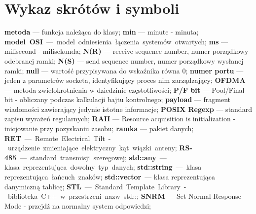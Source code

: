 \newpage
\chapter*{Wykaz skrótów i symboli}
\noindent
\textbf{metoda} --- funkcja należąca do klasy;\newline
\textbf{min} --- minute - minuta;\newline
\textbf{model OSI} --- model odniesienia łączenia systemów otwartych;\newline
\textbf{ms} --- milisecond - milisekunda;\newline
\textbf{N(R)} --- receive sequence number, numer porządkowy odebranej ramki;\newline
\textbf{N(S)} --- send sequence number, numer porządkowy wysłanej ramki;\newline
\textbf{null} --- wartość przypisywana do wskaźnika równa 0;\newline
\textbf{numer portu} --- jeden z parametrów socketa, identyfikujący proces nim zarządzający;\newline
\textbf{OFDMA} --- metoda zwielokrotnienia w dziedzinie częstotliwości;\newline
\textbf{P/F bit} --- Pool/Final bit - obliczany podczas kalkulacji bajtu kontrolnego;\newline
\textbf{payload} --- fragment wiadomości zawierający jedynie istotne informacje;\newline
\textbf{POSIX Regexp} --- standard zapisu wyrażeń regularnych;\newline
\textbf{RAII} --- Resource acquisition is initialization - inicjowanie przy pozyskaniu zasobu;\newline
\textbf{ramka} --- pakiet danych;\newline
\textbf{RET} --- Remote Electrical Tilt - urządzenie zmieniające elektryczny kąt wiązki anteny;\newline
\textbf{RS-485} --- standard transmisji szeregowej;\newline
\textbf{std::any} --- klasa reprezentująca dowolny typ danych;\newline
\textbf{std::string} --- klasa reprezentująca łańcuch znaków;\newline
\textbf{std::vector} --- klasa reprezentująca danymiczną tablicę;\newline
\textbf{STL} --- Standard Template Library - biblioteka C++ w przestrzeni nazw std::;\newline
\textbf{SNRM} --- Set Normal Response Mode - przejdź na normalny system odpowiedzi;\newline
